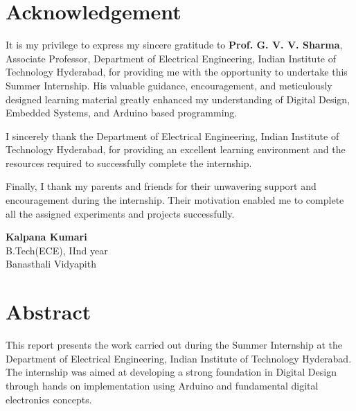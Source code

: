 \documentclass[12pt,a4paper]{report}
\begin{document}



\chapter*{Acknowledgement}

It is my privilege to express my sincere gratitude to \textbf{Prof. G. V. V. Sharma}, Associate Professor, Department of Electrical Engineering, Indian Institute of Technology Hyderabad, for providing me with the opportunity to undertake this Summer Internship. His valuable guidance, encouragement, and meticulously designed learning material greatly enhanced my understanding of Digital Design, Embedded Systems, and Arduino based programming.

I sincerely thank the Department of Electrical Engineering, Indian Institute of Technology Hyderabad, for providing an excellent learning environment and the resources required to successfully complete the internship.

Finally, I thank my parents and friends for their unwavering support and encouragement during the internship. Their motivation enabled me to complete all the assigned experiments and projects successfully.

\vspace{1.5cm}

\begin{flushright}
\textbf{Kalpana Kumari}\\
B.Tech(ECE), IInd year\\
Banasthali Vidyapith
\end{flushright}


\chapter*{Abstract}

This report presents the work carried out during the Summer Internship at the Department of Electrical Engineering, Indian Institute of Technology Hyderabad. The internship was aimed at developing a strong foundation in Digital Design through hands on implementation using Arduino and fundamental digital electronics concepts.
\end{document}
